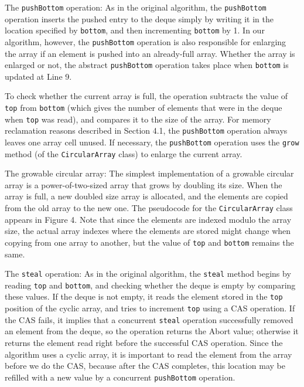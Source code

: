 The \lstinline!pushBottom! operation: As in the original algorithm,
the \lstinline!pushBottom! operation inserts the pushed entry to the
deque simply by writing it in the location specified by
\lstinline!bottom!, and then incrementing \lstinline!bottom! by 1. In
our algorithm, however, the \lstinline!pushBottom! operation is also
responsible for enlarging the array if an element is pushed into an
already-full array. Whether the array is enlarged or not, the abstract
\lstinline!pushBottom! operation takes place when \lstinline!bottom!
is updated at Line 9.

To check whether the current array is full, the operation subtracts
the value of \lstinline!top! from \lstinline!bottom! (which gives the
number of elements that were in the deque when \lstinline!top! was
read), and compares it to the size of the array. For memory
reclamation reasons described in Section 4.1, the
\lstinline!pushBottom! operation always leaves one array cell unused.
If necessary, the \lstinline!pushBottom! operation uses the
\lstinline!grow! method (of the \lstinline!CircularArray! class) to
enlarge the current array.

The growable circular array: The simplest implementation of a growable
circular array is a power-of-two-sized array that grows by doubling
its size. When the array is full, a new doubled size array is
allocated, and the elements are copied from the old array to the new
one. The pseudocode for the \lstinline!CircularArray! class appears in Figure
4. Note that since the elements are indexed modulo the array size, the
actual array indexes where the elements are stored might change when
copying from one array to another, but the value of \lstinline!top!
and \lstinline!bottom! remains the same.

The \lstinline!steal! operation: As in the original algorithm, the
\lstinline!steal! method begins by reading \lstinline!top! and
\lstinline!bottom!, and checking whether the deque is empty by
comparing these values. If the deque is not empty, it reads the
element stored in the \lstinline!top! position of the cyclic array,
and tries to increment \lstinline!top! using a CAS operation. If the
CAS fails, it implies that a concurrent \lstinline!steal! operation
successfully removed an element from the deque, so the operation
returns the Abort value; otherwise it returns the element read right
before the successful CAS operation. Since the algorithm uses a cyclic
array, it is important to read the element from the array before we do
the CAS, because after the CAS completes, this location may be
refilled with a new value by a concurrent \lstinline!pushBottom!
operation.

